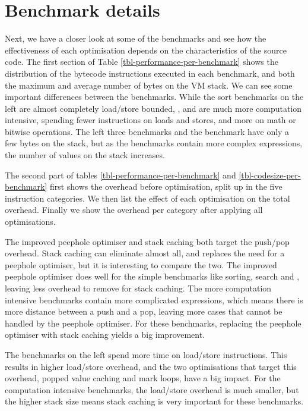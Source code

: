 \section{Benchmark details}
\label{sec-evaluation-benchmark-details}
Next, we have a closer look at some of the benchmarks and see how the effectiveness of each optimisation depends on the characteristics of the source code. The first section of Table \ref{tbl-performance-per-benchmark} shows the distribution of the bytecode instructions executed in each benchmark, and both the maximum and average number of bytes on the VM stack. We can see some important differences between the benchmarks. While the sort benchmarks on the left are almost completely load/store bounded, ,  and  are much more computation intensive, spending fewer instructions on loads and stores, and more on math or bitwise operations. The left three benchmarks and the  benchmark have only a few bytes on the stack, but as the benchmarks contain more complex expressions, the number of values on the stack increases.

The second part of tables \ref{tbl-performance-per-benchmark} and \ref{tbl-codesize-per-benchmark} first shows the overhead before optimisation, split up in the five instruction categories. We then list the effect of each optimisation on the total overhead. Finally we show the overhead per category after applying all optimisations.

The improved peephole optimiser and stack caching both target the push/pop overhead. Stack caching can eliminate almost all, and replaces the need for a peephole optimiser, but it is interesting to compare the two. The improved peephole optimiser does well for the simple benchmarks like sorting,  search and , leaving less overhead to remove for stack caching. The more computation intensive benchmarks contain more complicated expressions, which means there is more distance between a push and a pop, leaving more cases that cannot be handled by the peephole optimiser. For these benchmarks, replacing the peephole optimiser with stack caching yields a big improvement.

The benchmarks on the left spend more time on load/store instructions. This results in higher load/store overhead, and the two optimisations that target this overhead, popped value caching and mark loops, have a big impact. For the computation intensive benchmarks, the load/store overhead is much smaller, but the higher stack size means stack caching is very important for these benchmarks.


